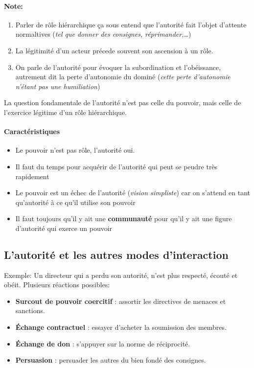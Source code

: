 \documentclass[11pt]{article} %
\begin{document}
\paragraph{Note: } 
\begin{enumerate}
    \item Parler de rôle hiérarchique ça sous entend que l'autorité
    fait l'objet d'attente normaltives (\textit{tel que donner des
    consignes, réprimander,\ldots})

    \item La légitimité d'un acteur précede souvent son ascension à
    un rôle.

    \item On parle de l'autorité pour évoquer la subordination et
    l'obéissance, autrement dit la perte d'autonomie du dominé
    (\textit{cette perte d'autonomie n'étant pas une humiliation})
\end{enumerate}

La question fondamentale de l'autorité n'est pas celle du pouvoir, mais
celle de l'exercice légitime d'un rôle hiérarchique.


\paragraph{Caractéristiques}
\begin{itemize}
    \item Le pouvoir n'est pas rôle, l'autorité oui.
    \item Il faut du temps pour acquérir de l'autorité qui peut se
        peudre très rapidement
    \item Le pouvoir est un échec de l'autorité (\textit{vision
        simpliste}) car on s'attend en tant qu'autorité à ce qu'il
        utilise son pouvoir
    \item Il faut toujours qu'il y ait une \textbf{communauté} pour
        qu'il y ait une figure d'autorité qui exerce un pouvoir
\end{itemize}

\subsection{L'autorité et les autres modes d'interaction}

Exemple: Un directeur qui a perdu son autorité, n'est plus respecté,
écouté et obéit.
Plusieurs réactions possibles:

\begin{itemize}

 \item \textbf{Surcout de pouvoir coercitif} : assortir les directives
de menaces et sanctions.
	\item \textbf{Échange contractuel} : essayer d'acheter la soumission
        des membres.
	\item \textbf{Échange de don} : s'appuyer sur la norme de
        réciprocité.
	\item \textbf{Persuasion} : persuader les autres du bien fondé des
        consignes. 
\end{itemize}
\end{document}
